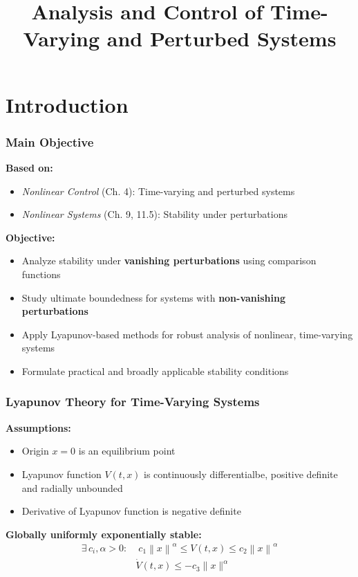 \documentclass[student, noshadow, lsr, english, aspectratio=169, t]{ITR_LSR_slides}
\title{Analysis and Control of Time-Varying and Perturbed Systems}
\begin{document}
\begin{frame}
    \titlepage
\end{frame}


\section{Introduction}

\begin{frame}
    \frametitle{Main Objective}

    \textbf{Based on:}
    \begin{itemize}
        \item \textit{Nonlinear Control} (Ch. 4): Time-varying and perturbed systems
        \item \textit{Nonlinear Systems} (Ch. 9, 11.5): Stability under perturbations
    \end{itemize}
	\vspace{0.5cm}
    \textbf{Objective:}
    \begin{itemize}
        \item Analyze stability under \textbf{vanishing perturbations} using comparison functions
        \item Study ultimate boundedness for systems with \textbf{non-vanishing perturbations}
        \item Apply Lyapunov-based methods for robust analysis of nonlinear, time-varying systems
        \item Formulate practical and broadly applicable stability conditions
    \end{itemize}
\end{frame}

\begin{frame}
	\frametitle{Lyapunov Theory for Time-Varying Systems}
	\textbf{Assumptions:}
	\begin{itemize}
		\item Origin $x=0$ is an equilibrium point
		\item Lyapunov function $V(t,x)$ is continuously differentialbe, positive definite and radially unbounded
		\item Derivative of Lyapunov function is negative definite
	\end{itemize}
	\vspace{0.5cm}
	\textbf{Globally uniformly exponentially stable:}
	\begin{align*}
		\exists\, c_i, \alpha > 0: & \; c_1\left\|x\right\|^\alpha \leq V(t,x) \leq c_2\left\|x\right\|^\alpha  \\
		& \dot{V}(t,x) \leq -c_3\|x\|^\alpha
	\end{align*}
\end{frame}
\end{document}
